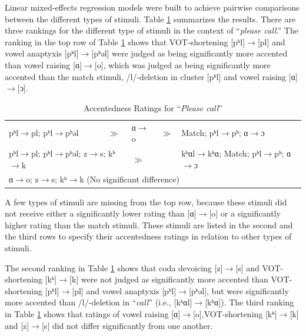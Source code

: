 Linear mixed-effects regression models were built to achieve pairwise comparisons between the different types of stimuli. Table \ref{table:pc1} summarizes the results. There are three rankings for the different type of stimuli in the context of “\textit{please call}.” The ranking in the top row of Table \ref{table:pc1} shows that VOT-shortening [pʰl]$\rightarrow$[pl] and vowel anaptyxis [pʰl]$\rightarrow$[pʰəl] were judged as being significantly more accented than vowel raising [ɑ]$\rightarrow$[o], which was judged as being significantly more accented than the match stimuli, /l/-deletion in cluster [pʰl] and vowel raising [ɑ]$\rightarrow$[ɔ]. 

\begin{table}[!h]
  \figSpace
  \centering
  \caption{Accentedness Ratings for “\textit{Please call}” }
  \label{table:pc1}%
    \begin{tabular}{lclcl}
    \toprule
  pʰl$\rightarrow$pl; pʰl$\rightarrow$pʰəl  &$\gg$ &  ɑ$\rightarrow$o &$\gg$ & Match; pʰl$\rightarrow$pʰ; ɑ$\rightarrow$ɔ\\
  \multicolumn{2}{l}{pʰl$\rightarrow$pl; pʰl$\rightarrow$pʰəl; z$\rightarrow$s; kʰ$\rightarrow$k}&$\gg$&&kʰɑl$\rightarrow$kʰɑ; Match; pʰl$\rightarrow$pʰ; ɑ$\rightarrow$ɔ\\
  \multicolumn{5}{l}{ɑ$\rightarrow$o; z$\rightarrow$s; kʰ$\rightarrow$k (No significant difference)} \\
    \bottomrule
    \end{tabular}%
    \figSpace
\end{table}%

A few types of stimuli are missing from the top row, because these stimuli did not receive either a significantly lower rating than [ɑ]$\rightarrow$[o] or a significantly higher rating than the match stimuli. These stimuli are listed in the second and the third rows to specify their accentedness ratings in relation to other types of stimuli.

The second ranking in Table \ref{table:pc1} shows that coda devoicing [z]$\rightarrow$[s] and VOT-shortening [kʰ]$\rightarrow$[k] were not judged as significantly more accented than VOT-shortening [pʰl]$\rightarrow$[pl] and vowel anaptyxis [pʰl]$\rightarrow$[pʰəl], but were significantly more accented than /l/-deletion in “\textit{call}” (i.e., [kʰɑl]$\rightarrow$[kʰɑ]). The third ranking in Table \ref{table:pc1} shows that ratings of vowel raising [ɑ]$\rightarrow$[o],VOT-shortening [kʰ]$\rightarrow$[k] and [z]$\rightarrow$[s] did not differ significantly from one another.

